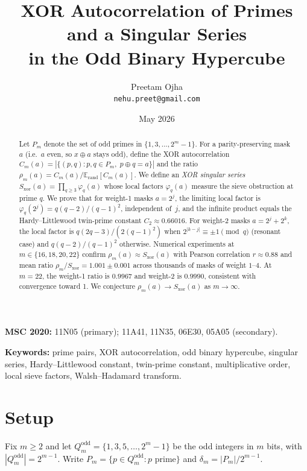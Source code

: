 \documentclass[11pt]{article}
\title{%
  XOR Autocorrelation of Primes and a Singular Series\\
  in the Odd Binary Hypercube
}
\author{Preetam Ojha \\ \texttt{nehu.preet@gmail.com}}
\date{May 2026}
\begin{document}
\maketitle

\begin{abstract}
Let $P_m$ denote the set of odd primes in $\{1,3,\ldots,2^m-1\}$.
For a parity-preserving mask $a$ (i.e.\ $a$ even, so $x \oplus a$ stays odd),
define the XOR autocorrelation
$C_m(a) = |\{(p,q) : p,q \in P_m,\; p \oplus q = a\}|$
and the ratio $\rho_m(a) = C_m(a)/\mathbb{E}_{\mathrm{rand}}[C_m(a)]$.
We define an \emph{XOR singular series}
$S_{\mathrm{xor}}(a) = \prod_{q \geq 3} \varphi_q(a)$
whose local factors $\varphi_q(a)$ measure the sieve obstruction at prime $q$.
We prove that for weight-1 masks $a = 2^j$, the limiting local factor is
$\varphi_q(2^j) = q(q-2)/(q-1)^2$, independent of~$j$,
and the infinite product equals the Hardy--Littlewood twin-prime constant
$C_2 \approx 0.66016$.
For weight-2 masks $a = 2^j + 2^k$, the local factor is
$q(2q-3)/(2(q-1)^2)$ when $2^{|k-j|} \equiv \pm 1 \pmod{q}$ (resonant case)
and $q(q-2)/(q-1)^2$ otherwise.
Numerical experiments at $m \in \{16, 18, 20, 22\}$ confirm
$\rho_m(a) \approx S_{\mathrm{xor}}(a)$ with Pearson correlation $r \approx 0.88$
and mean ratio $\rho_m/S_{\mathrm{xor}} = 1.001 \pm 0.001$ across
thousands of masks of weight $1$--$4$.
At $m = 22$, the weight-1 ratio is $0.9967$ and weight-2 is $0.9990$,
consistent with convergence toward 1.
We conjecture $\rho_m(a) \to S_{\mathrm{xor}}(a)$ as $m \to \infty$.
\end{abstract}

\noindent\textbf{MSC 2020:} 11N05 (primary); 11A41, 11N35, 06E30, 05A05 (secondary).

\smallskip
\noindent\textbf{Keywords:} prime pairs, XOR autocorrelation, odd binary hypercube,
singular series, Hardy--Littlewood constant, twin-prime constant,
multiplicative order, local sieve factors, Walsh--Hadamard transform.

\section{Setup}

Fix $m \geq 2$ and let $Q_m^{\mathrm{odd}} = \{1, 3, 5, \ldots, 2^m - 1\}$
be the odd integers in $m$ bits, with $|Q_m^{\mathrm{odd}}| = 2^{m-1}$.
Write $P_m = \{p \in Q_m^{\mathrm{odd}} : p \text{ prime}\}$
and $\delta_m = |P_m|/2^{m-1}$.
\end{document}
